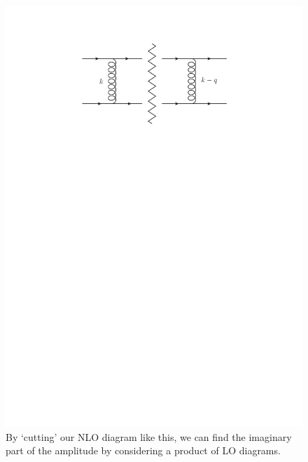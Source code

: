 \begin{figure}[t]
\centering
\includegraphics[scale=1]{Images/cuts.pdf} 
\caption{By `cutting' our NLO diagram like this, we can find the imaginary part of the amplitude by considering a product of LO diagrams. }
\label{fig:cut}
\end{figure}

